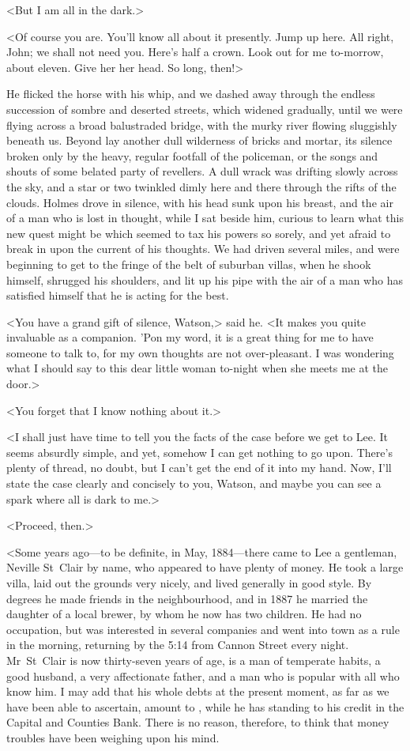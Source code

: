 <But I am all in the dark.>

<Of course you are. You'll know all about it presently. Jump up here. All right, John; we shall not need you. Here's half a crown. Look out for me to-morrow, about eleven. Give her her head. So long, then!>

He flicked the horse with his whip, and we dashed away through the endless succession of sombre and deserted streets, which widened gradually, until we were flying across a broad balustraded bridge, with the murky river flowing sluggishly beneath us. Beyond lay another dull wilderness of bricks and mortar, its silence broken only by the heavy, regular footfall of the policeman, or the songs and shouts of some belated party of revellers. A dull wrack was drifting slowly across the sky, and a star or two twinkled dimly here and there through the rifts of the clouds. Holmes drove in silence, with his head sunk upon his breast, and the air of a man who is lost in thought, while I sat beside him, curious to learn what this new quest might be which seemed to tax his powers so sorely, and yet afraid to break in upon the current of his thoughts. We had driven several miles, and were beginning to get to the fringe of the belt of suburban villas, when he shook himself, shrugged his shoulders, and lit up his pipe with the air of a man who has satisfied himself that he is acting for the best.

<You have a grand gift of silence, Watson,> said he. <It makes you quite invaluable as a companion. 'Pon my word, it is a great thing for me to have someone to talk to, for my own thoughts are not over-pleasant. I was wondering what I should say to this dear little woman to-night when she meets me at the door.>

<You forget that I know nothing about it.>

<I shall just have time to tell you the facts of the case before we get to Lee. It seems absurdly simple, and yet, somehow I can get nothing to go upon. There's plenty of thread, no doubt, but I can't get the end of it into my hand. Now, I'll state the case clearly and concisely to you, Watson, and maybe you can see a spark where all is dark to me.>

<Proceed, then.>

<Some years ago—to be definite, in May, 1884—there came to Lee a gentleman, Neville St~Clair by name, who appeared to have plenty of money. He took a large villa, laid out the grounds very nicely, and lived generally in good style. By degrees he made friends in the neighbourhood, and in 1887 he married the daughter of a local brewer, by whom he now has two children. He had no occupation, but was interested in several companies and went into town as a rule in the morning, returning by the 5:14 from Cannon Street every night. Mr~St~Clair is now thirty-seven years of age, is a man of temperate habits, a good husband, a very affectionate father, and a man who is popular with all who know him. I may add that his whole debts at the present moment, as far as we have been able to ascertain, amount to , while he has  standing to his credit in the Capital and Counties Bank. There is no reason, therefore, to think that money troubles have been weighing upon his mind.


